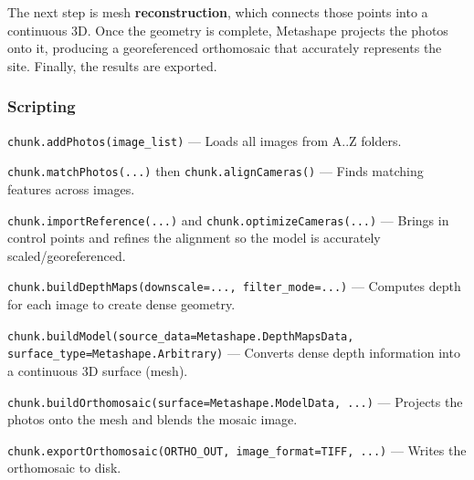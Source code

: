 \documentclass[a4paper,12pt]{article}
\begin{document}
The next step is mesh \textbf{reconstruction}, which connects those points into a continuous 3D. Once the geometry is complete, Metashape projects the photos onto it, producing a georeferenced orthomosaic that accurately represents the site. Finally, the results are exported.

\subsubsection{Scripting}


\begin{tcolorbox}[title=Add Photos]
\texttt{chunk.addPhotos(image\_list)} --- Loads all images from A..Z folders.
\end{tcolorbox}

\begin{tcolorbox}[title=Photo Alignment]
\texttt{chunk.matchPhotos(...)} then \texttt{chunk.alignCameras()} --- Finds matching features across images.
\end{tcolorbox}

\begin{tcolorbox}[title=GCP Import \& Optimization (if used)]
\texttt{chunk.importReference(...)} and \texttt{chunk.optimizeCameras(...)} --- Brings in control points and refines the alignment so the model is accurately scaled/georeferenced.
\end{tcolorbox}

\begin{tcolorbox}[title=Dense Cloud Generation \& Filtering]
\texttt{chunk.buildDepthMaps(downscale=..., filter\_mode=...)} --- Computes depth for each image to create dense geometry.
\end{tcolorbox}

\begin{tcolorbox}[title=Mesh Reconstruction]
\texttt{chunk.buildModel(source\_data=Metashape.DepthMapsData, surface\_type=Metashape.Arbitrary)} --- Converts dense depth information into a continuous 3D surface (mesh).
\end{tcolorbox}

\begin{tcolorbox}[title=Orthomosaic Generation]
\texttt{chunk.buildOrthomosaic(surface=Metashape.ModelData, ...)} --- Projects the photos onto the mesh and blends the mosaic image.
\end{tcolorbox}

\begin{tcolorbox}[title=Export as GeoTIFF/OBJ]
\texttt{chunk.exportOrthomosaic(ORTHO\_OUT, image\_format=TIFF, ...)} --- Writes the orthomosaic to disk.
\end{tcolorbox}
\end{document}
